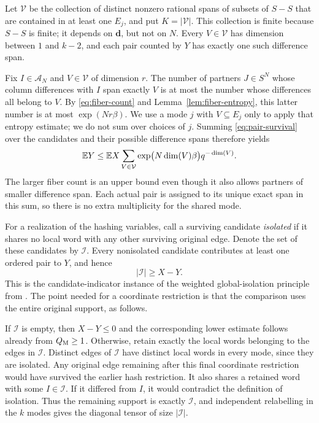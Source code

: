 Let $\mathcal V$ be the collection of distinct nonzero rational
spans of subsets of $S-S$ that are contained in at least one $E_j$,
and put $K=|\mathcal V|$. This collection is finite because $S-S$
is finite; it depends on $\mathbf d$, but not on $N$. Every
$V\in\mathcal V$ has dimension between $1$ and $k-2$, and each
pair counted by $Y$ has exactly one such difference span.

Fix $I\in\mathcal A_N$ and $V\in\mathcal V$ of dimension $r$.
The number of partners $J\in S^N$ whose column differences with
$I$ span exactly $V$ is at most the number whose differences all
belong to $V$. By \eqref{eq:fiber-count} and
Lemma~\ref{lem:fiber-entropy}, this latter number is at most
$\exp(Nr\beta)$. We use a mode $j$ with $V\subseteq E_j$ only to
apply that entropy estimate; we do not sum over choices of $j$.
Summing \eqref{eq:pair-survival} over the candidates and their
possible difference spans therefore yields
\begin{equation}
 \mathbb E Y\leq \mathbb E X
       \sum_{V\in\mathcal V}
          \exp\bigl(N\dim(V)\beta\bigr)q^{-\dim(V)}.
 \label{eq:collision-expectation}
\end{equation}
The larger fiber count is an upper bound even though it also
allows partners of smaller difference span. Each actual pair is
assigned to its unique exact span in this sum, so there is no
extra multiplicity for the shared mode.

For a realization of the hashing variables, call a surviving
candidate \emph{isolated} if it shares no local word with any other
surviving original edge. Denote the set of these candidates by
$\mathcal I$. Every nonisolated candidate contributes at least one
ordered pair to $Y$, and hence
\[
 |\mathcal I|\geq X-Y.
\]
This is the candidate-indicator instance of the weighted
global-isolation principle from \cite{VC2019}. The point needed
for a coordinate restriction is that the comparison uses the
entire original support, as follows.

If $\mathcal I$ is empty, then $X-Y\leq 0$ and the corresponding
lower estimate follows already from $Q_{\mathrm M}\geq 1$. Otherwise,
retain exactly the local words belonging to the edges in
$\mathcal I$. Distinct edges of $\mathcal I$ have distinct local
words in every mode, since they are isolated. Any original edge
remaining after this final coordinate restriction would have
survived the earlier hash restriction. It also shares a retained
word with some $I\in\mathcal I$. If it differed from $I$, it would
contradict the definition of isolation. Thus the remaining support
is exactly $\mathcal I$, and independent relabelling in the $k$
modes gives the diagonal tensor of size $|\mathcal I|$.

